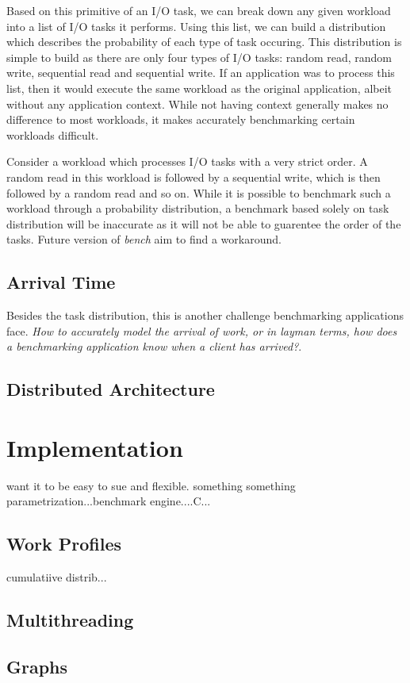 \documentclass[10pt, author, twocolumn]{article}
\begin{document}
Based on this primitive of an I/O task, we can break down any given workload into a list of I/O tasks it performs. Using this list, we can build a distribution which describes the probability of each type of task occuring. This distribution is simple to build as there are only four types of I/O tasks: random read, random write, sequential read and sequential write. If an application was to process this list, then it would execute the same workload as the original application, albeit without any application context. While not having context generally makes no difference to most workloads, it makes accurately benchmarking certain workloads difficult.

Consider a workload which processes I/O tasks with a very strict order. A random read in this workload is followed by a sequential write, which is then followed by a random read and so on. While it is possible to benchmark such a workload through a probability distribution, a benchmark based solely on task distribution will be inaccurate as it will not be able to guarentee the order of the tasks. Future version of \textit{bench} aim to find a workaround.

\subsection{Arrival Time}
Besides the task distribution, this is another challenge benchmarking applications face. \textit{How to accurately model the arrival of work, or in layman terms, how does a benchmarking application know when a client has arrived?}. 

\subsection{Distributed Architecture}

\section{Implementation}
want it to be easy to sue and flexible. something something parametrization...benchmark engine....C...

\subsection{Work Profiles}
cumulatiive distrib...

\subsection{Multithreading}

\subsection{Graphs}
	 
\end{document}
